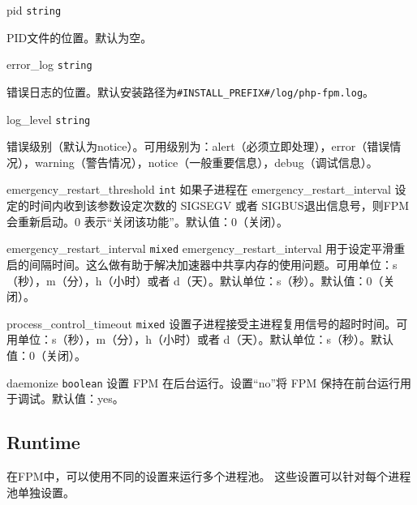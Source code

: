 \begin{compactitem}
\item pid \texttt{string}

PID文件的位置。默认为空。

\item error\_log \texttt{string}

错误日志的位置。默认安装路径为\texttt{\#INSTALL\_PREFIX\#/log/php-fpm.log}。

\item log\_level \texttt{string}

错误级别（默认为notice）。可用级别为：alert（必须立即处理），error（错误情况），warning（警告情况），notice（一般重要信息），debug（调试信息）。

\item emergency\_restart\_threshold \texttt{int}
如果子进程在 emergency\_restart\_interval 设定的时间内收到该参数设定次数的 SIGSEGV 或者 SIGBUS退出信息号，则FPM会重新启动。0 表示“关闭该功能”。默认值：0（关闭）。

\item emergency\_restart\_interval \texttt{mixed}
emergency\_restart\_interval 用于设定平滑重启的间隔时间。这么做有助于解决加速器中共享内存的使用问题。可用单位：s（秒），m（分），h（小时）或者 d（天）。默认单位：s（秒）。默认值：0（关闭）。

\item process\_control\_timeout \texttt{mixed}
设置子进程接受主进程复用信号的超时时间。可用单位：s（秒），m（分），h（小时）或者 d（天）。默认单位：s（秒）。默认值：0（关闭）。

\item daemonize \texttt{boolean}
设置 FPM 在后台运行。设置“no”将 FPM 保持在前台运行用于调试。默认值：yes。

\end{compactitem}


\subsection{Runtime}


在FPM中，可以使用不同的设置来运行多个进程池。 这些设置可以针对每个进程池单独设置。

